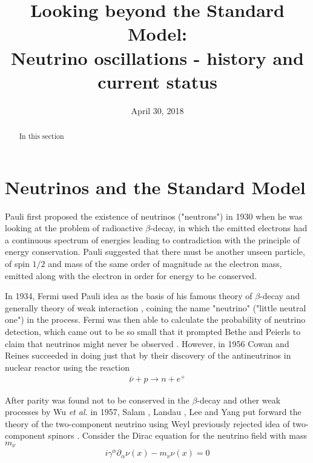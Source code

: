 \documentclass[english]{article}
\begin{document}
\title{Looking beyond the Standard Model: \\Neutrino oscillations - history and current status}
\author{}
\date{April 30, 2018}
\maketitle

\thispagestyle{fancy}

\begin{abstract}
In this section
\end{abstract}

\section{Neutrinos and the Standard Model}
	Pauli first proposed the existence of neutrinos ("neutrons") in 1930 \cite{pauliletter1930} when he was looking at the problem of radioactive $\beta$-decay, in which the emitted electrons had a continuous spectrum of energies leading to contradiction with the principle of energy conservation. Pauli suggested that there must be another unseen particle, of spin $1/2$ and mass of the same order of magnitude as the electron mass, emitted along with the electron in order for energy to be conserved.
    
    In 1934, Fermi used Pauli idea as the basis of his famous theory of $\beta$-decay and generally theory of weak interaction \cite{fermi1934}, coining the name "neutrino" ("little neutral one") in the process. Fermi was then able to calculate the probability of neutrino detection, which came out to be so small that it prompted Bethe and Peierls to claim that neutrinos might never be observed \cite{bethepeierls1934}. However, in 1956 Cowan and Reines succeeded in doing just that \cite{cowanreines1956} by their discovery of the antineutrinos in nuclear reactor using the reaction
    \begin{gather}
    	\bar{\nu}+p \rightarrow n+e^{+}
    \end{gather}
    
    After parity was found not to be conserved in the $\beta$-decay and other weak processes \cite{wu1957} by Wu \textit{et al.} in 1957, Salam \cite{salam1956}, Landau \cite{landau1957}, Lee and Yang \cite{leeyang1957} put forward the theory of the two-component neutrino using Weyl previously rejected idea of two-component spinors \cite{weyl1929}. Consider the Dirac equation for the neutrino field with mass $m_{\nu}$
    \begin{gather}
    	i\gamma^{\alpha} \partial_{\alpha} \nu (x) - m_{\nu} \nu (x) = 0
    \end{gather}
    
\end{document}
